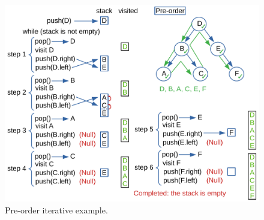 \begin{figure}[H]
	\begin{center}
		\includegraphics[scale=.6]{chapters/appendix/images/appendixtree/treesappendix_1.pdf}
		\caption[Pre-order iterative example.]{Pre-order iterative example.}
		\label{appendixtrees_1}
	\end{center}
\end{figure}

